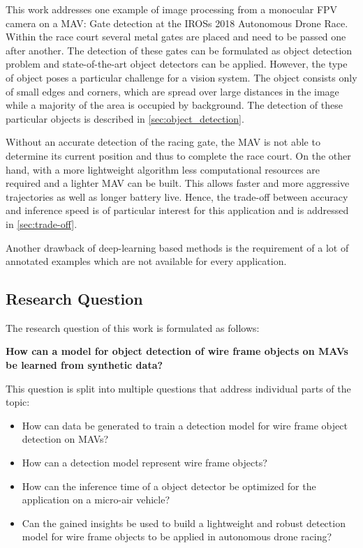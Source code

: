 This work addresses one example of image processing from a monocular \ac{FPV} camera on a \ac{MAV}: Gate detection at the \acp{IROS} 2018 Autonomous Drone Race. Within the race court several metal gates are placed and need to be passed one after another. The detection of these gates can be formulated as object detection problem and state-of-the-art object detectors can be applied. However, the type of object poses a particular challenge for a vision system. The object consists only of small edges and corners, which are spread over large distances in the image while a majority of the area is occupied by background. The detection of these particular objects is described in \autoref{sec:object_detection}. 

Without an accurate detection of the racing gate, the \ac{MAV} is not able to determine its current position and thus to complete the race court. On the other hand, with a more lightweight algorithm less computational resources are required and a lighter \ac{MAV} can be built. This allows faster and more aggressive trajectories as well as longer battery live. Hence, the trade-off between accuracy and inference speed is of particular interest for this application and is addressed in \autoref{sec:trade-off}.

Another drawback of deep-learning based methods is the requirement of a lot of annotated examples which are not available for every application. 


\subsection*{Research Question}

The research question of this work is formulated as follows:
\begin{center}
	\textbf{How can a model for object detection of wire frame objects on \acp{MAV} be learned from synthetic data?}
\end{center}


This question is split into multiple questions that address individual parts of the topic:

\begin{itemize}
	\item How can data be generated to train a detection model for wire frame object detection on \acp{MAV}?
	\item How can a detection model represent wire frame objects?
	\item How can the inference time of a object detector be optimized for the application on a micro-air vehicle?
	\item Can the gained insights be used to build a lightweight and robust detection model for wire frame objects to be applied in autonomous drone racing?
\end{itemize}

